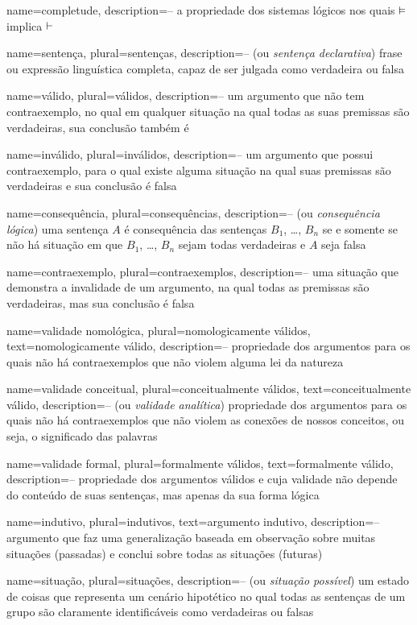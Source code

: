 {
 name=completude,
 description={-- a propriedade dos sistemas lógicos nos quais $\vDash $ implica $\vdash$}
}

{
 name=sentença,
 plural=sentenças,
 description={-- (ou \textit{sentença declarativa}) frase ou expressão linguística completa, capaz de ser julgada como verdadeira ou falsa}
}

{
 name=válido,
 plural=válidos,
 description={-- um argumento que não tem contraexemplo, no qual em qualquer situação na qual todas as suas premissas são verdadeiras, sua conclusão também é}
}

{
 name=inválido,
 plural=inválidos,
 description={-- um argumento que possui contraexemplo, para o qual existe alguma situação na qual suas premissas são verdadeiras e sua conclusão é falsa}
}

{
 name=consequência,
 plural=consequências,
 description={-- (ou \textit{consequência lógica}) uma sentença $A$ é consequência das sentenças $B_1$, \dots, $B_n$ se e somente se não há situação em que $B_1$, \dots, $B_n$ sejam todas verdadeiras e $A$ seja falsa}
}

{
 name=contraexemplo,
 plural=contraexemplos,
 description={-- uma situação que demonstra a invalidade de um argumento, na qual todas as premissas são verdadeiras, mas sua conclusão é falsa}
}

{
 name=validade nomológica,
 plural=nomologicamente válidos,
 text=nomologicamente válido,
 description={-- propriedade dos argumentos para os quais não há contraexemplos que não violem alguma lei da natureza}
}

{
 name=validade conceitual,
 plural=conceitualmente válidos,
 text=conceitualmente válido,
 description={-- (ou \textit{validade analítica}) propriedade dos argumentos para os quais não há contraexemplos que não violem as conexões de nossos conceitos, ou seja, o significado das palavras}
}

{
 name=validade formal,
 plural=formalmente válidos,
 text=formalmente válido,
 description={-- propriedade dos argumentos válidos e cuja validade não depende do conteúdo de suas sentenças, mas apenas da sua forma lógica}
}

{
 name=indutivo,
 plural=indutivos,
 text=argumento indutivo,
 description={-- argumento que faz uma generalização baseada em observação sobre muitas situações (passadas) e conclui sobre todas as situações (futuras)}
}


{
 name=situação,
 plural=situações,
 description={-- (ou \textit{situação possível}) um estado de coisas que representa um cenário hipotético no qual todas as sentenças de um grupo são claramente identificáveis como verdadeiras ou falsas}
}
